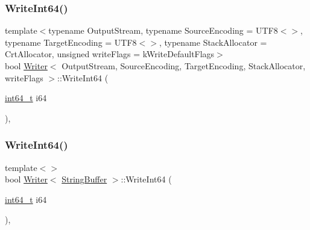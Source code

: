\subsubsection{\texorpdfstring{Write\+Int64()}{WriteInt64()}\hspace{0.1cm}{\footnotesize\ttfamily [1/2]}}
{\footnotesize\ttfamily template$<$typename Output\+Stream, typename Source\+Encoding = U\+T\+F8$<$$>$, typename Target\+Encoding = U\+T\+F8$<$$>$, typename Stack\+Allocator = Crt\+Allocator, unsigned write\+Flags = k\+Write\+Default\+Flags$>$ \\
bool \hyperlink{classWriter}{Writer}$<$ Output\+Stream, Source\+Encoding, Target\+Encoding, Stack\+Allocator, write\+Flags $>$\+::Write\+Int64 (\begin{DoxyParamCaption}\item[{\hyperlink{stdint_8h_a414156feea104f8f75b4ed9e3121b2f6}{int64\+\_\+t}}]{i64 }\end{DoxyParamCaption})\hspace{0.3cm}{\ttfamily [inline]}, {\ttfamily [protected]}}

\mbox{\label{classWriter_a3528a42394d50f3b92659de517433c85}} 
\subsubsection{\texorpdfstring{Write\+Int64()}{WriteInt64()}\hspace{0.1cm}{\footnotesize\ttfamily [2/2]}}
{\footnotesize\ttfamily template$<$$>$ \\
bool \hyperlink{classWriter}{Writer}$<$ \hyperlink{fwd_8h_ab956b6537825abf8aac4112e81cfad7e}{String\+Buffer} $>$\+::Write\+Int64 (\begin{DoxyParamCaption}\item[{\hyperlink{stdint_8h_a414156feea104f8f75b4ed9e3121b2f6}{int64\+\_\+t}}]{i64 }\end{DoxyParamCaption})\hspace{0.3cm}{\ttfamily [inline]}, {\ttfamily [protected]}}

\mbox{\label{classWriter_a44862b3eba8d84b909c69aba875c9f4d}} 

